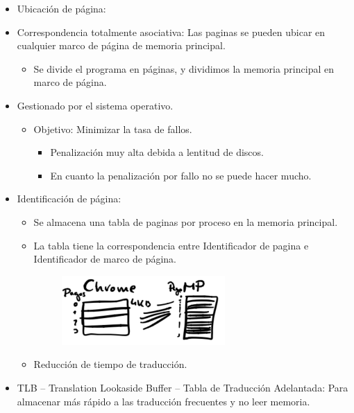 \documentclass[12pt, twoside, openright]{report} %
\begin{document}
  \begin{itemize}
  \item
    Ubicación de página:
  \item
    Correspondencia totalmente asociativa: Las paginas se pueden ubicar
    en cualquier marco de página de memoria principal.

    \begin{itemize}
    
    \item
      Se divide el programa en páginas, y dividimos la memoria principal
      en marco de página.
    \end{itemize}
  \item
    Gestionado por el sistema operativo.

    \begin{itemize}
    
    \item
      Objetivo: Minimizar la tasa de fallos.

      \begin{itemize}
      
      \item
        Penalización muy alta debida a lentitud de discos.
      \item
        En cuanto la penalización por fallo no se puede hacer mucho.
      \end{itemize}
    \end{itemize}
  \item
    Identificación de página:

    \begin{itemize}
    \item
      Se almacena una tabla de paginas por proceso en la memoria
      principal.
    \item
      La tabla tiene la correspondencia entre Identificador de pagina e
      Identificador de marco de página.

      \begin{figure}[H]
        {\includegraphics[scale=.65]{Untitled 29.png}}
      \end{figure}
    \item
      Reducción de tiempo de traducción.
    \end{itemize}
  \item
    TLB -- Translation Lookaside Buffer -- Tabla de Traducción
    Adelantada: Para almacenar más rápido a las traducción frecuentes y
    no leer memoria.


\end{itemize}
\end{document}
